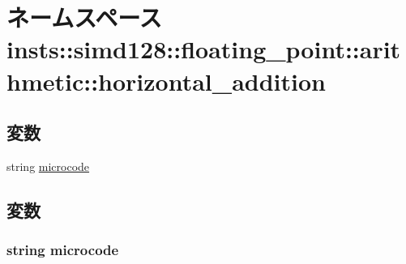 \hypertarget{namespaceinsts_1_1simd128_1_1floating__point_1_1arithmetic_1_1horizontal__addition}{
\section{ネームスペース insts::simd128::floating\_\-point::arithmetic::horizontal\_\-addition}
\label{namespaceinsts_1_1simd128_1_1floating__point_1_1arithmetic_1_1horizontal__addition}
}
\subsection*{変数}
\begin{DoxyCompactItemize}
\item 
string \hyperlink{namespaceinsts_1_1simd128_1_1floating__point_1_1arithmetic_1_1horizontal__addition_a770f11a173e99389a8802f0107ed8f52}{microcode}
\end{DoxyCompactItemize}


\subsection{変数}
\hypertarget{namespaceinsts_1_1simd128_1_1floating__point_1_1arithmetic_1_1horizontal__addition_a770f11a173e99389a8802f0107ed8f52}{
\subsubsection[{microcode}]{\setlength{\rightskip}{0pt plus 5cm}string {\bf microcode}}}
\label{namespaceinsts_1_1simd128_1_1floating__point_1_1arithmetic_1_1horizontal__addition_a770f11a173e99389a8802f0107ed8f52}
